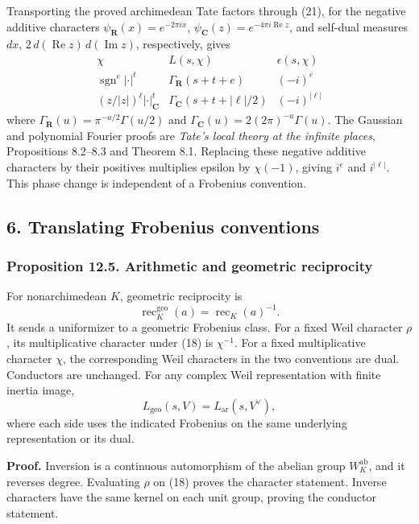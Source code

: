 \documentclass[11pt,a4paper]{article}
\begin{document}
Transporting the proved archimedean Tate factors through (21), for the
negative additive characters \(\psi_{\mathbf R}(x)=e^{-2\pi ix}\),
\(\psi_{\mathbf C}(z)=e^{-4\pi i\operatorname{Re}z}\), and self-dual
measures \(dx\), \(2\,d(\operatorname{Re}z)\,d(\operatorname{Im}z)\),
respectively, gives \[
\begin{array}{c|c|c}
\chi&L(s,\chi)&\epsilon(s,\chi)\\ \hline
\operatorname{sgn}^e|\cdot|^t&
\Gamma_{\mathbf R}(s+t+e)&(-i)^e\\
(z/|z|)^\ell|\cdot|_{\mathbf C}^t&
\Gamma_{\mathbf C}(s+t+|\ell|/2)&(-i)^{|\ell|}
\end{array}
\tag{22}
\] where \(\Gamma_{\mathbf R}(u)=\pi^{-u/2}\Gamma(u/2)\) and
\(\Gamma_{\mathbf C}(u)=2(2\pi)^{-u}\Gamma(u)\). The Gaussian and
polynomial Fourier proofs are \emph{Tate's local theory at the infinite
places}, Propositions 8.2--8.3 and Theorem 8.1. Replacing these negative
additive characters by their positives multiplies epsilon by
\(\chi(-1)\), giving \(i^e\) and \(i^{|\ell|}\). This phase change is
independent of a Frobenius convention.

\subsection{6. Translating Frobenius
conventions}\label{translating-frobenius-conventions}

\subsubsection{Proposition 12.5. Arithmetic and geometric
reciprocity}\label{proposition-12.5.-arithmetic-and-geometric-reciprocity}

For nonarchimedean \(K\), geometric reciprocity is \[
\operatorname{rec}^{\mathrm{geo}}_K(a)=\operatorname{rec}_K(a)^{-1}.
\tag{18}
\] It sends a uniformizer to a geometric Frobenius class. For a fixed
Weil character \(\rho\), its multiplicative character under (18) is
\(\chi^{-1}\). For a fixed multiplicative character \(\chi\), the
corresponding Weil characters in the two conventions are dual.
Conductors are unchanged. For any complex Weil representation with
finite inertia image, \[
L_{\mathrm{geo}}(s,V)=L_{\mathrm{ar}}(s,V^\vee),
\tag{19}
\] where each side uses the indicated Frobenius on the same underlying
representation or its dual.

\textbf{Proof.} Inversion is a continuous automorphism of the abelian
group \(W_K^{\mathrm{ab}}\), and it reverses degree. Evaluating \(\rho\)
on (18) proves the character statement. Inverse characters have the same
kernel on each unit group, proving the conductor statement.
\end{document}
